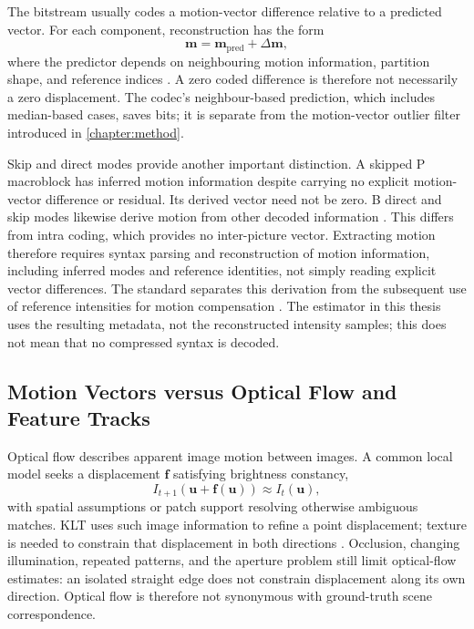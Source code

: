 The bitstream usually codes a motion-vector difference relative to a predicted
vector. For each component, reconstruction has the form
\begin{equation}
  \mathbf{m}=\mathbf{m}_{\mathrm{pred}}+\Delta\mathbf{m},
\end{equation}
where the predictor depends on neighbouring motion information, partition
shape, and reference indices
\cite[Sec.~8.4.1, Eqs.~(8-172) and~(8-173)]{ITUT_H264_2026}. A zero coded
difference is therefore not necessarily a zero displacement. The codec's
neighbour-based prediction, which includes median-based cases, saves bits;
it is separate from the motion-vector outlier filter introduced in
\autoref{chapter:method}.

Skip and direct modes provide another important distinction. A skipped P
macroblock has inferred motion information despite carrying no explicit
motion-vector difference or residual. Its derived vector need not be zero.
B direct and skip modes likewise derive motion from other decoded information
\cite[Secs.~8.4.1.1 and~8.4.1.2]{ITUT_H264_2026}. This differs from intra
coding, which provides no inter-picture vector. Extracting motion therefore
requires syntax parsing and reconstruction of motion information, including
inferred modes and reference identities, not simply reading explicit vector
differences. The standard separates this derivation from the subsequent use of
reference intensities for motion compensation
\cite[Secs.~8.4.1 and~8.4.2]{ITUT_H264_2026}. The estimator in this thesis
uses the resulting metadata, not the reconstructed intensity samples; this
does not mean that no compressed syntax is decoded.

\subsection{Motion Vectors versus Optical Flow and Feature Tracks}

Optical flow describes apparent image motion between images. A common local
model seeks a displacement $\mathbf{f}$ satisfying brightness constancy,
\begin{equation}
  I_{t+1}(\mathbf{u}+\mathbf{f}(\mathbf{u}))\approx I_t(\mathbf{u}),
\end{equation}
with spatial assumptions or patch support resolving otherwise ambiguous
matches. KLT uses such image information to refine a point displacement;
texture is needed to constrain that displacement in both directions
\cite{shi1994good,young2020fast}. Occlusion, changing illumination, repeated
patterns, and the aperture problem still limit optical-flow estimates: an
isolated straight edge does not constrain displacement along its own direction.
Optical flow is therefore not synonymous with ground-truth scene
correspondence.


